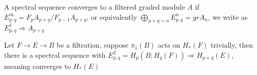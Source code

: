 \documentclass[../main.tex]{subfiles}
\begin{document}
\begin{definition}
A spectral sequence converges to a filtered graded module $A$ if $E^\infty_{p,q}=F_pA_{p+q}/F_{p-1}A_{p+q}$, or equivalently $\displaystyle\bigoplus_{p+q=n}E^n_{p,q}=grA_n$, we write as $E_{p,q}^1\Rightarrow A_{p+q}$
\begin{center}
\end{center}
\end{definition}

\begin{theorem}
Let $F\to E\to B$ be a filtration, suppose $\pi_1(B)$ acts on $H_*(F)$ trivially, then there is a spectral sequence with $E^2_{p,q}=H_p(B;H_q(F))\Rightarrow H_{p+q}(E)$, meaning converges to $H_*(E)$
\end{theorem}
\end{document}
